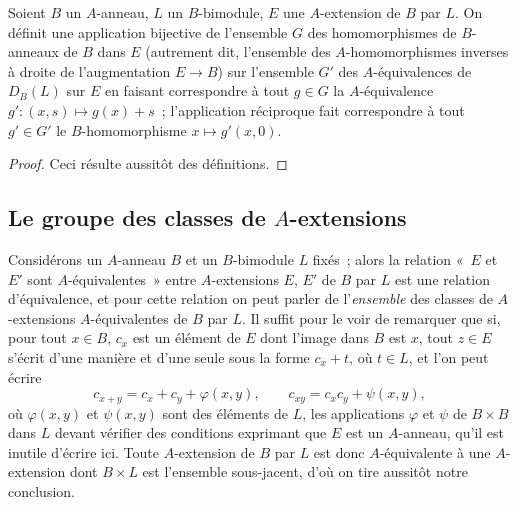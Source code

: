 \begin{proposition}[18.2.10]
\label{0.18.2.10-fr}
Soient $B$ un $A$-anneau, $L$ un $B$-bimodule, $E$ une $A$-extension de $B$
par $L$. On définit une application bijective de l'ensemble $G$ des
homomorphismes de $B$-anneaux de $B$ dans $E$ (autrement dit, l'ensemble des
$A$-homomorphismes inverses à droite de l'augmentation $E\to B$) sur
l'ensemble $G'$ des $A$-équivalences de $D_B(L)$ sur $E$ en faisant
correspondre à tout $g\in G$ la $A$-équivalence
$g':(x,s)\mapsto g(x)+s$~; l'application réciproque fait correspondre à tout
$g'\in G'$ le $B$-homomorphisme $x\mapsto g'(x,0)$.
\end{proposition}

\begin{proof}
Ceci résulte aussitôt des définitions.
\end{proof}

\subsection{Le groupe des classes de $A$-extensions}
\label{subsection:0.18.3-fr}

\begin{env}[18.3.1]
\label{0.18.3.1-fr}
Considérons un $A$-anneau $B$ et un $B$-bimodule $L$ fixés~; alors la relation
«~$E$ et $E'$ sont $A$-équivalentes~» entre $A$-extensions $E$, $E'$ de $B$
par $L$ est une relation d'équivalence, et pour cette relation on peut parler
de l'\emph{ensemble} des classes de $A$-extensions $A$-équivalentes de $B$ par
$L$. Il suffit pour le voir de remarquer que si, pour tout $x\in B$, $c_x$ est
un élément de $E$ dont l'image dans $B$ est $x$, tout $z\in E$ s'écrit d'une
manière et d'une seule sous la forme $c_x+t$, où $t\in L$, et l'on peut écrire
\[
  c_{x+y}=c_x+c_y+\varphi(x,y),\qquad
  c_{xy}=c_xc_y+\psi(x,y),
\]
où $\varphi(x,y)$ et $\psi(x,y)$ sont des éléments de $L$, les applications
$\varphi$ et $\psi$ de $B\times B$ dans $L$ devant vérifier des conditions
exprimant que $E$ est un $A$-anneau, qu'il est inutile d'écrire ici. Toute
$A$-extension de $B$ par $L$ est donc $A$-équivalente à une $A$-extension dont
$B\times L$ est l'ensemble sous-jacent, d'où on tire aussitôt notre conclusion.
\end{env}

